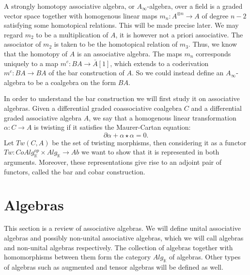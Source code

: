 \documentclass[../thesis.tex]{subfiles}
\begin{document}
        A strongly homotopy associative algebra, or $A_\infty$-algebra, over a field is a graded vector space together with homogenous linear maps $m_n:A^{\otimes n}\rightarrow A$ of degree $n-2$ satisfying some homotopical relations. This will be made precise later. We may regard $m_2$ to be a multiplication of $A$, it is however not a priori associative. The associator of $m_2$ is taken to be the homotopical relation of $m_3$. Thus, we know that the homotopy of $A$ is an associative algebra. The maps $m_n$ corresponds uniquely to a map $m^c:BA\rightarrow \bar{A}[1]$, which extends to a coderivation $m^c : BA\rightarrow BA$ of the bar construction of $A$. So we could instead define an $A_\infty$-algebra to be a coalgebra on the form $BA$.


        In order to understand the bar construction we will first study it on associative algebras. Given a differential graded coassociative coalgebra $C$ and a differential graded associative algebra $A$, we say that a homogenous linear transformation $\alpha: C\rightarrow A$ is twisting if it satisfies the Maurer-Cartan equation:
            \begin{equation*}
                \partial\alpha + \alpha\star\alpha = 0.
            \end{equation*}
        Let $Tw(C,A)$ be the set of twisting morphisms, then considering it as a functor $Tw : CoAlg_{\mathbb{K}}^{op}\times Alg_{\mathbb{K}} \rightarrow Ab$ we want to show that it is represented in both arguments. Moreover, these representations give rise to an adjoint pair of functors, called the bar and cobar construction.

        \begin{center}
        \end{center}

        

    \section{Algebras}

            This section is a review of associative algebras. We will define unital associative algebras and possibly non-unital associative algebras, which we will call algebras and non-unital algebras respectively. The collection of algebras together with homomorphisms between them form the category $Alg_{\mathbb{K}}$ of algebras. Other types of algebras such as augmented and tensor algebras will be defined as well.
\end{document}
